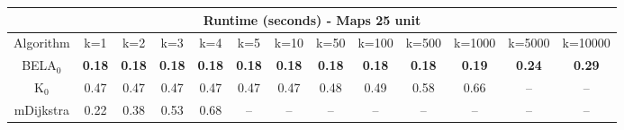 \begin{tabular}{c|cccccccccccc}\toprule
\multicolumn{13}{c}{Runtime (seconds) - Maps 25 unit}\\ \midrule
Algorithm & k=1 & k=2 & k=3 & k=4 & k=5 & k=10 & k=50 & k=100 & k=500 & k=1000 & k=5000 & k=10000 \\ \midrule
BELA$_0$ & \textbf{0.18} & \textbf{0.18} & \textbf{0.18} & \textbf{0.18} & \textbf{0.18} & \textbf{0.18} & \textbf{0.18} & \textbf{0.18} & \textbf{0.18} & \textbf{0.19} & \textbf{0.24} & \textbf{0.29} \\
K$_0$ & 0.47 & 0.47 & 0.47 & 0.47 & 0.47 & 0.47 & 0.48 & 0.49 & 0.58 & 0.66 & -- & -- \\
mDijkstra & 0.22 & 0.38 & 0.53 & 0.68 & -- & -- & -- & -- & -- & -- & -- & -- \\ \bottomrule 
\end{tabular}
